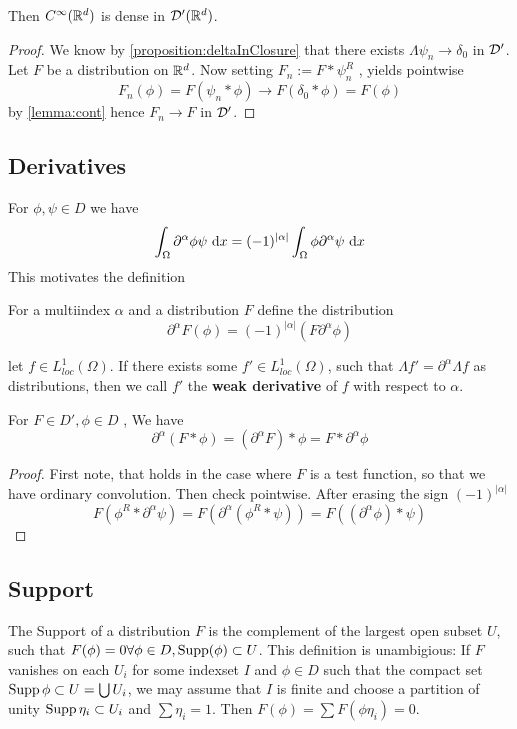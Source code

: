 	\begin{corollary}
		Then $C^\infty(\mathbb{R}^d)$ is dense in $\mathcal{D}'(\mathbb{R}^d)$. 
	\end{corollary}
	\begin{proof}
		We know by \ref{proposition:deltaInClosure} that there exists $\Lambda \psi_n \to \delta_0$ in $\mathcal{D}'$.
		Let $F$ be a distribution on $\mathbb{R}^d$. Now setting $F_n := F * \psi_n^R$ , yields pointwise 
		\[
		F_n(\phi) = F (\psi_n * \phi) \to F(\delta_0 * \phi) = F (\phi)
		\]
		by \ref{lemma:cont}
		hence $F_n \to F$ in $\mathcal{D}'$.  %
		
	\end{proof}
	\subsection{Derivatives}
	For $\phi , \psi \in D$ we have
	\[
	\int_\Omega \partial^\alpha \phi \psi \ \mathrm{d} x = (-1)^{|\alpha|} \int_\Omega \phi \partial^\alpha \psi \ \mathrm{d} x
	\]
	This motivates the definition
	\begin{definition}
		For a multiindex $\alpha$ and a distribution $F$ define the distribution
		\[\partial^\alpha F (\phi) = (-1)^{|\alpha|}(F \partial^\alpha \phi)\]    
	\end{definition}
	\begin{remark}
		let $f \in L^1_{loc}(\Omega)$. If there exists some $f' \in L^1_{loc}(\Omega)$, such that $\Lambda f' = \partial^\alpha \Lambda  f$ as distributions, then we call $f'$ the {\bf weak derivative} of $f$ with respect to $\alpha$.
	\end{remark}
	\begin{proposition}
		For $F \in D', \phi \in D $ , We have 
		\[\partial^\alpha (F * \phi) = (\partial^\alpha F) * \phi = F * \partial^\alpha \phi\]
	\end{proposition}
	\begin{proof}
		First note, that holds in the case where $F$ is a test function, so that we have ordinary convolution. 
		Then check pointwise. After erasing the sign $(-1)^{|\alpha|}$
		\[
		F(\phi^R * \partial^\alpha \psi) = F(\partial^\alpha (\phi^R * \psi)) = F((\partial^\alpha \phi) * \psi)
		\]
		
	\end{proof}
	\subsection{Support}
	The Support of a distribution $F$ is the complement of the largest open subset $U$, such that $F(\phi) = 0 \forall \phi \in D, \operatorname{Supp}(\phi) \subset U$.  This definition is unambigious: If $F$ vanishes on each $U_i$ for some indexset $I$ and $\phi \in D$ such that the compact set $\operatorname{Supp} \phi \subset U = \bigcup U_i$, we may assume that $I$ is finite and choose a partition of unity $\operatorname{Supp} \eta_i \subset U_i$ and $\sum \eta_i = 1$. Then $F(\phi) = \sum F(\phi \eta_i) = 0$.
